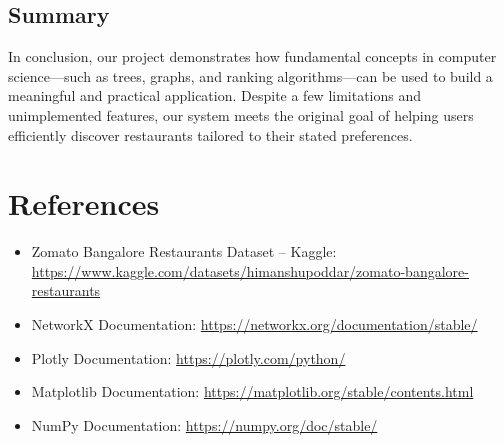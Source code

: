 \documentclass[fontsize=11pt]{article}
\begin{document}
\subsection*{Summary}

In conclusion, our project demonstrates how fundamental concepts in computer science—such as trees, graphs, and ranking algorithms—can be used to build a meaningful and practical application. Despite a few limitations and unimplemented features, our system meets the original goal of helping users efficiently discover restaurants tailored to their stated preferences.


\section*{References}
\begin{itemize}
    \item Zomato Bangalore Restaurants Dataset – Kaggle: \url{https://www.kaggle.com/datasets/himanshupoddar/zomato-bangalore-restaurants}
    \item NetworkX Documentation: \url{https://networkx.org/documentation/stable/}
    \item Plotly Documentation: \url{https://plotly.com/python/}
    \item Matplotlib Documentation: \url{https://matplotlib.org/stable/contents.html}
    \item NumPy Documentation: \url{https://numpy.org/doc/stable/}
\end{itemize}
\end{document}
